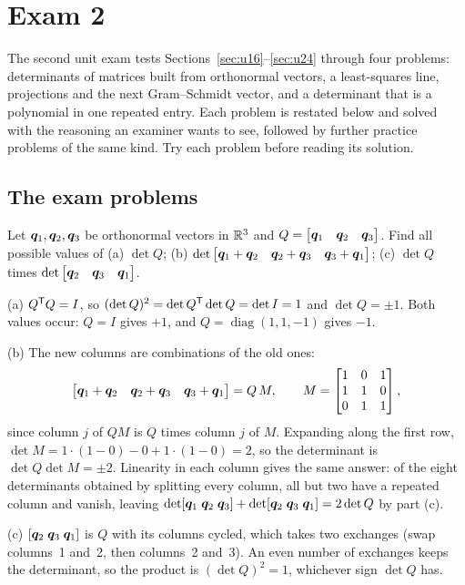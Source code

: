\section{Exam 2}\label{sec:u28}

The second unit exam tests Sections~\ref{sec:u16}--\ref{sec:u24} through four problems:
determinants of matrices built from orthonormal vectors, a least-squares line, projections
and the next Gram--Schmidt vector, and a determinant that is a polynomial in one repeated
entry. Each problem is restated below and solved with the reasoning an examiner wants to see,
followed by further practice problems of the same kind. Try each problem before reading its
solution.

\subsection{The exam problems}

\begin{example}\label{ex:u28-q}
Let $\boldsymbol{q}_1,\boldsymbol{q}_2,\boldsymbol{q}_3$ be orthonormal vectors in $\mathbb{R}^{3}$ and
$Q=\begin{bmatrix}\boldsymbol{q}_1&\boldsymbol{q}_2&\boldsymbol{q}_3\end{bmatrix}$. Find all possible values of
(a) $\det Q$; (b) $\det\begin{bmatrix}\boldsymbol{q}_1+\boldsymbol{q}_2&\boldsymbol{q}_2+\boldsymbol{q}_3&\boldsymbol{q}_3+\boldsymbol{q}_1\end{bmatrix}$;
(c) $\det Q$ times $\det\begin{bmatrix}\boldsymbol{q}_2&\boldsymbol{q}_3&\boldsymbol{q}_1\end{bmatrix}$.

(a) $Q^{\mathsf{T}} Q=I$, so $(\det Q)^{2}=\det Q^{\mathsf{T}}\det Q=\det I=1$ and $\det Q=\pm1$. Both values occur:
$Q=I$ gives $+1$, and $Q=\operatorname{diag}(1,1,-1)$ gives $-1$.

(b) The new columns are combinations of the old ones:
\[
  \begin{bmatrix}\boldsymbol{q}_1+\boldsymbol{q}_2&\boldsymbol{q}_2+\boldsymbol{q}_3&\boldsymbol{q}_3+\boldsymbol{q}_1\end{bmatrix}
  =Q\,M,\qquad M=\begin{bmatrix} 1&0&1\\ 1&1&0\\ 0&1&1\end{bmatrix},
\]
since column $j$ of $QM$ is $Q$ times column $j$ of $M$. Expanding along the first row,
$\det M=1\cdot(1-0)-0+1\cdot(1-0)=2$, so the determinant is $\det Q\det M=\pm2$.
Linearity in each column gives the same answer: of the eight determinants obtained by
splitting every column, all but two have a repeated column and vanish, leaving
$\det[\boldsymbol{q}_1\;\boldsymbol{q}_2\;\boldsymbol{q}_3]+\det[\boldsymbol{q}_2\;\boldsymbol{q}_3\;\boldsymbol{q}_1]=2\det Q$ by part (c).

(c) $[\boldsymbol{q}_2\;\boldsymbol{q}_3\;\boldsymbol{q}_1]$ is $Q$ with its columns cycled, which takes two
exchanges (swap columns~1 and~2, then columns~2 and~3). An even number of exchanges keeps the
determinant, so the product is $(\det Q)^{2}=1$, whichever sign $\det Q$ has.
\end{example}

